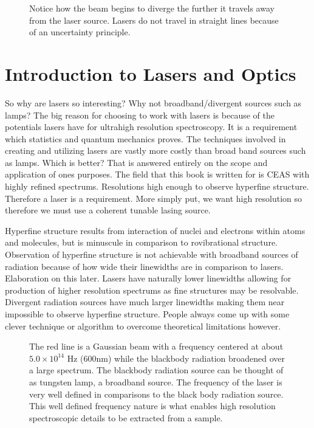 \documentclass[11pt,a4paper]{book}
\newcommand{\imginput}[1]{} %
\begin{document}
		\begin{figure} [!ht]
			\centering
			\def\svgwidth{\columnwidth}
			\Huge
			\resizebox{10cm}{!}{\imginput{images/laser-gaussian-beam.pdf_tex}}
			\caption{Notice how the beam begins to diverge the further it travels away from the laser source. Lasers do not travel in straight lines because of an uncertainty principle.}
			\label{fig:laser-gaussian-beam}
		\end{figure}
		
	\section{Introduction to Lasers and Optics}	
		\label{sec:Introduction to Lasers and Optics}
		So why are lasers so interesting? Why not broadband/divergent sources such as lamps? The  big reason for choosing to work with lasers is because of the potentials lasers have for ultrahigh resolution spectroscopy. It is a requirement which statistics and quantum mechanics proves. The techniques involved in creating and utilizing lasers are vastly more costly than broad band sources such as lamps. Which is better? That is answered entirely on the scope and application of ones purposes. The field that this book is written for is CEAS with highly refined spectrums. Resolutions high enough to observe hyperfine structure. Therefore a laser is a requirement. More simply put, we want high resolution so therefore we must use a coherent tunable lasing source.
		
		
		Hyperfine structure results from interaction of nuclei and electrons within atoms and molecules, but is minuscule in comparison to rovibrational structure. Observation of hyperfine structure is not achievable with broadband sources of radiation because of how wide their linewidths are in comparison to lasers. Elaboration on this later. Lasers have naturally lower linewidths allowing for production of higher resolution spectrums as fine structures may be resolvable. Divergent radiation sources have much larger linewidths making them near impossible to observe hyperfine structure. People always come up with some clever technique or algorithm to overcome theoretical limitations however.
		
		\begin{figure} [!ht]
			\centering
			\def\svgwidth{\columnwidth}
			\resizebox{12cm}{!}{\imginput{images/linewidths-gaus-blackbody.pdf_tex}}
			\caption{The red line is a Gaussian beam with a frequency centered at about $5.0 \times 10 ^ {14}$ Hz  (600nm) while the blackbody radiation broadened over a large spectrum. The blackbody radiation source can be thought of as tungsten lamp, a broadband source. The frequency of the laser is very well defined in comparisons to the black body radiation source. This well defined frequency nature is what enables high resolution spectroscopic details to be extracted from a sample.}
			\label{fig:linewidths-gaus-blackbody}
		\end{figure}
				
\end{document}
